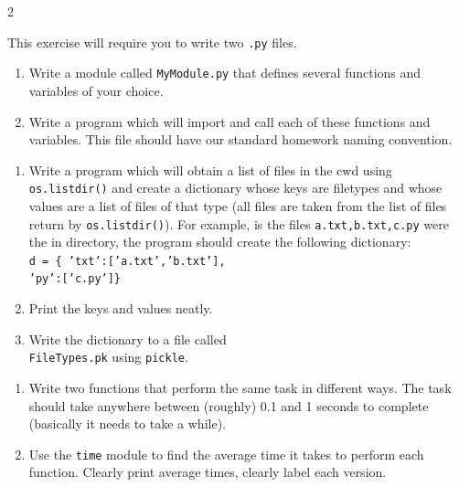 \documentclass[12pt]{article}%
\newcommand{\code}[1]{\texttt{#1}}
\begin{document}
\begin{multicols*}{2}

\begin{Exercise}[origin={10 points, Python}]

This exercise will require you to write two \code{.py} files.

\begin{enumerate}[leftmargin=*]
	\item Write a module called \code{MyModule.py} that defines several functions and variables of your choice.
	\item Write a program which will import and call each of these functions and variables. This file should have our standard homework naming convention.
\end{enumerate}

\end{Exercise}

\begin{Exercise}[origin={15 points, Python}]

\begin{enumerate}[leftmargin=*]
	\item Write a program which will obtain a list of files in the cwd using \code{os.listdir()} and create a dictionary whose keys are filetypes and whose values are a list of files of that type (all files are taken from the list of files return by \code{os.listdir()}). For example, is the files \code{a.txt,b.txt,c.py} were the in directory, the program should create the following dictionary: \\
	\code{d = \{ 'txt':['a.txt','b.txt'], \\
	'py':['c.py']\}}
	\item Print the keys and values neatly.
	\item Write the dictionary to a file called \\ \code{FileTypes.pk} using \code{pickle}.
\end{enumerate}

\end{Exercise}


\vfill\null
\columnbreak

\begin{Exercise}[origin={20 points, Python}]

\begin{enumerate}[leftmargin=*]
	\item Write two functions that perform the same task in different ways. The task should take anywhere between (roughly) 0.1 and 1 seconds to complete (basically it needs to take a while).
	\item Use the \code{time} module to find the average time it takes to perform each function. Clearly print average times, clearly label each version.
\end{enumerate}


\end{Exercise}
\end{multicols*}
\end{document}
